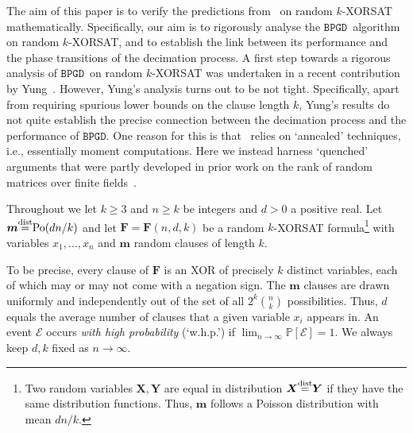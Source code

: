 \documentclass[10pt,reqno]{amsart}
\numberwithin{equation}{section}
\renewcommand{\vec}[1]{\boldsymbol{#1}}
\newcommand\disteq{\stacksign{dist}{=}}
\newcommand{\BPGD}{\ensuremath{\mathtt{BPGD}}}
\newcommand\PHI{\vec F}
\newcommand\cE{\mathcal E}
\newcommand\vX{\vec X}
\newcommand\vY{\vec Y}
\newcommand\vm{\vec m}
\newcommand{\Po}{{\rm Po}}
\newcommand\brk[1]{\left\lbrack{#1}\right\rbrack}
\newcommand{\whp}{w.h.p.}
\newcommand{\stacksign}[2]{{\stackrel{\mbox{\scriptsize #1}}{#2}}}
\newcommand\pr{\mathbb{P}}
\def\pr{{\mathbb P}}
\begin{document}
The aim of this paper is to verify the predictions from~\cite{RTS} on random $k$-XORSAT mathematically.
Specifically, our aim is to rigorously analyse the \BPGD\ algorithm on random $k$-XORSAT, and to establish the link between its performance and the phase transitions of the decimation process.
A first step towards a rigorous analysis of \BPGD\ on random $k$-XORSAT was undertaken in a recent contribution by Yung~\cite{Yung}.
However, Yung's analysis turns out to be not tight.
Specifically, apart from requiring spurious lower bounds on the clause length $k$, Yung's results do not quite establish the precise connection between the decimation process and the performance of \BPGD.
One reason for this is that~\cite{Yung} relies on `annealed' techniques, i.e., essentially moment computations.
Here we instead harness `quenched' arguments that were partly developed in prior work on the rank of random matrices over finite fields~\cite{Ayre,Maurice}.

Throughout we let $k\geq3$ and $n\geq k$ be integers and $d>0$ a positive real.
Let $\vm\disteq\Po(dn/k)$ and let $\PHI=\PHI(n,d,k)$ be a random $k$-XORSAT formula\footnote{
		Two random variables $\vX, \vY$ are equal in distribution $\vX\disteq \vY$ if they have the same distribution functions. 
		Thus, $\vm$ follows a Poisson distribution with mean $dn/k$.}
	with variables $x_1,\ldots,x_n$ and $\vm$ random clauses of length $k$.
	
To be precise, every clause of $\PHI$ is an XOR of precisely $k$ distinct variables, each of which may or may not come with a negation sign.
The $\vm$ clauses are drawn uniformly and independently out of the set of all $2^k\binom nk$ possibilities.
Thus, $d$ equals the average number of clauses that a given variable $x_i$ appears in.
An event $\cE$ occurs \emph{with high probability} (`\whp') if $\lim_{n\to\infty}\pr\brk{\cE}=1$.
We always keep $d,k$ fixed as $n\to\infty$.
\end{document}
